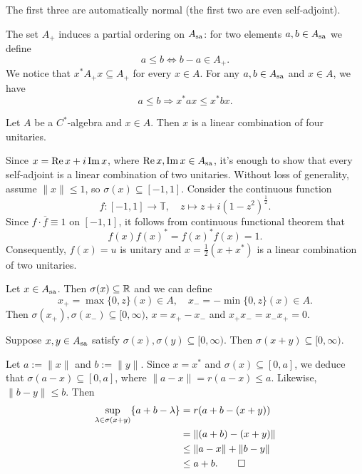 \begin{remark}
  The first three are automatically normal (the first two are even self-adjoint).
\end{remark}

The set $A_+$ induces a partial ordering on $A_{\operatorname{sa}}$: for two elements $a, b \in A_{\operatorname{sa}}$
we define $$a \leq b \Leftrightarrow b - a \in A_+.$$
We notice that $x^* A_+ x \subseteq A_+$ for every $x \in A$.
For any $a, b \in A_{\operatorname{sa}}$ and $x \in A$, we have 
$$a \leq b \Rightarrow x^* a x \leq x^* b x.$$

\begin{proposition}
  Let $A$ be a $C^*$-algebra and $x \in A$. Then $x$ is a linear combination of four unitaries.
\end{proposition}

\begin{myproof}
  Since $x = \operatorname{Re} x + i \operatorname{Im} x$, where $\operatorname{Re} x, \operatorname{Im} x \in A_{\operatorname{sa}}$,
  it's enough to show that every self-adjoint is a linear combination of two unitaries.
  Without loss of generality, assume $\| x\| \leq 1$, so $\sigma(x) \subseteq [-1, 1]$.
  Consider the continuous function $$f: [-1, 1] \to \mathbb{T},\quad z \mapsto z + i(1 - z^2)^{\frac{1}{2}}.$$
  Since $f \cdot \overline{f} \equiv 1$ on $[-1, 1]$, it follows from continuous functional theorem that
  $$f(x) f(x)^* = f(x)^* f(x) = 1.$$
  Consequently, $f(x) = u$ is unitary and $x = \frac{1}{2} (x + x^*)$ is a linear combination of two unitaries. 
\end{myproof}

\begin{definition}
  Let $x \in A_{\operatorname{sa}}$. Then $\sigma(x) \subseteq \mathbb {R}$ and we can define 
  $$x_+ = \max \{0, z\} (x) \in A,\quad x_- = - \min \{0, z\} (x) \in A.$$
  Then $\sigma(x_+), \sigma(x_- ) \subseteq [0, \infty)$, $x = x_+ - x_-$
  and $x_+ x_- = x_- x_+ = 0$.
\end{definition}

\begin{lemma}
  Suppose $x, y \in A_{\operatorname{sa}}$ satisfy $\sigma(x), \sigma(y) \subseteq [0, \infty)$.
  Then $\sigma(x + y) \subseteq [0, \infty)$.
\end{lemma}

\begin{myproof}
  Let $a := \| x\|$ and $b := \|y\|$.
  Since $x = x^*$ and $\sigma(x) \subseteq [0, a]$, we deduce that $\sigma(a - x) \subseteq [0, a]$,
  where $\| a - x\| = r(a - x) \leq a$. Likewise, $\|b - y\| \leq b$.
  Then 
  \begin{align*}
    \sup_{\lambda \in \sigma(x + y)} \{a + b - \lambda\} &= r(a + b - (x + y))\\
    &= \|(a + b) - (x + y)\|\\
    &\leq \|a - x\| + \|b - y\|\\
    &\leq a + b. \qedhere
  \end{align*}
\end{myproof}

